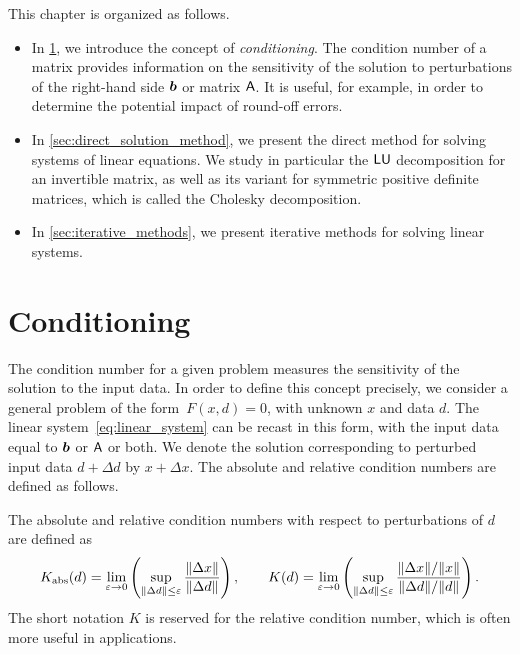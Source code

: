 This chapter is organized as follows.
\begin{itemize}
    \item
        In \cref{sec:conditioning},
        we introduce the concept of \emph{conditioning}.
        The condition number of a matrix provides information on the sensitivity of the solution to perturbations of the right-hand side $\mathbf{\boldsymbol{b}}$ or matrix $\mathsf A$.
        It is useful, for example, in order to determine the potential impact of round-off errors.

    \item
        In \cref{sec:direct_solution_method},
        we present the direct method for solving systems of linear equations.
        We study in particular the $\mathsf L \mathsf U$ decomposition for an invertible matrix,
        as well as its variant for symmetric positive definite matrices,
        which is called the Cholesky decomposition.

    \item
        In \cref{sec:iterative_methods},
        we present iterative methods for solving linear systems.
\end{itemize}

\section{Conditioning}%
\label{sec:conditioning}

The condition number for a given problem measures the sensitivity of the solution to the input data.
In order to define this concept precisely,
we consider a general problem of the form~$F(x, d) = 0$,
with unknown $x$ and data $d$.
The linear system~\eqref{eq:linear_system} can be recast in this form,
with the input data equal to $\mathbf{\boldsymbol{b}}$ or $\mathsf A$ or both.
We denote the solution corresponding to perturbed input data $d + \Delta d$ by $x + \Delta x$.
The absolute and relative condition numbers are defined as follows.

\begin{definition}
    [Condition number for the problem $F(x, d) = 0$]
    The absolute and relative condition numbers with respect to perturbations of $d$ are defined as
    \[
        K_{\rm abs}(d) = \lim_{\varepsilon \to 0} \left( \sup_{\lVert\Delta d\rVert \leq \varepsilon} \frac{\lVert\Delta x\rVert}{\lVert\Delta d\rVert} \right),
        \qquad
        K(d) = \lim_{\varepsilon \to 0} \left( \sup_{\lVert\Delta d\rVert \leq \varepsilon} \frac{\lVert\Delta x\rVert / \lVert x\rVert}{\lVert\Delta d\rVert / \lVert d\rVert} \right).
    \]
    The short notation $K$ is reserved for the relative condition number,
    which is often more useful in applications.
\end{definition}

